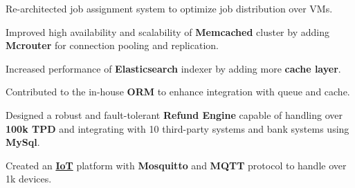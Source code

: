 \documentclass[]{plushcv}
\begin{document}
\begin{minipage}[t]{0.70\textwidth}
\vspace{5pt} %

\begin{tightemize}
\item Re-architected job assignment system to optimize job distribution over VMs.
\item Improved high availability and scalability of \textbf{Memcached} cluster by adding \textbf{Mcrouter} for connection pooling and replication.
\item Increased performance of \textbf{Elasticsearch} indexer by adding more \textbf{cache layer}.
\item Contributed to the in-house \textbf{ORM} to enhance integration with queue and cache.
\end{tightemize}

\vspace{5pt} %
\begin{tightemize}
\item  Designed a robust and fault-tolerant \textbf{Refund Engine} capable of handling over \textbf{100k TPD} and integrating with 10 third-party systems and bank systems using \textbf{MySql}.

\end{tightemize}
\sectionsep


\sectionsep
{}
\begin{tightemize}
\item Created an \href{https://en.wikipedia.org/wiki/Internet_of_things}{\textbf{IoT}} platform with \textbf{Mosquitto} and \textbf{MQTT} protocol to handle over 1k devices.

\end{tightemize}

\vspace{2pt}
\begin{tightemize}
	

\end{tightemize}
\end{minipage}
\end{document}
